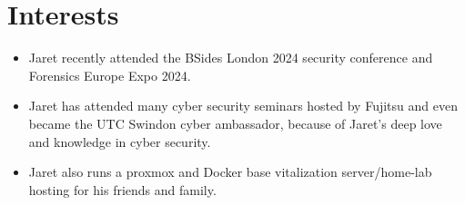 \section*{Interests}
\begin{itemize}
    \item Jaret recently attended the BSides London 2024  security conference and Forensics Europe Expo 2024.
    \item Jaret has attended many cyber security seminars hosted by Fujitsu and even became the UTC Swindon cyber ambassador, because of Jaret’s deep love and knowledge in cyber security.
    \item Jaret also runs a proxmox and Docker base vitalization server/home-lab hosting for his friends and family.
\end{itemize}
